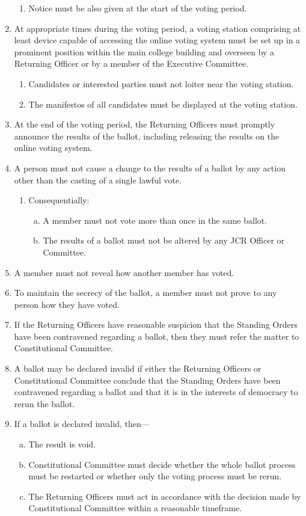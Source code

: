 \documentclass[12pt]{article}  %
\begin{document}
\begin{enumerate}
\begin{enumerate}
		\item Notice must be also given at the start of the voting period.
	\end{enumerate}
	\item At appropriate times during the voting period, a voting station comprising at least device capable of accessing the online voting system must be set up in a prominent position within the main college building and overseen by a Returning Officer or by a member of the Executive Committee.
	\begin{enumerate}
		\item Candidates or interested parties must not loiter near the voting station.
		\item The manifestos of all candidates must be displayed at the voting station.
	\end{enumerate}
	\item At the end of the voting period, the Returning Officers must promptly announce the results of the ballot, including releasing the results on the online voting system.
	\item A person must not cause a change to the results of a ballot by any action other than the casting of a single lawful vote.
	\begin{enumerate}
		\item Consequentially:
		\begin{enumerate}[(a)]
			\item A member must not vote more than once in the same ballot.
			\item The results of a ballot must not be altered by any JCR Officer or Committee.
		\end{enumerate}
	\end{enumerate}
	\item A member must not reveal how another member has voted.
	\item To maintain the secrecy of the ballot, a member must not prove to any person how they have voted. 
	\item If the Returning Officers have reasonable suspicion that the Standing Orders have been contravened regarding a ballot, then they must refer the matter to Constitutional Committee.
	\item A ballot may be declared invalid if either the Returning Officers or Constitutional Committee conclude that the Standing Orders have been contravened regarding a ballot and that it is in the interests of democracy to rerun the ballot.
	\item If a ballot is declared invalid, then—
	\begin{enumerate}[(a)]
		\item The result is void.
		\item Constitutional Committee must decide whether the whole ballot process must be restarted or whether only the voting process must be rerun.
		\item The Returning Officers must act in accordance with the decision made by Constitutional Committee within a reasonable timeframe.
	\end{enumerate}

\end{enumerate}
\end{document}
